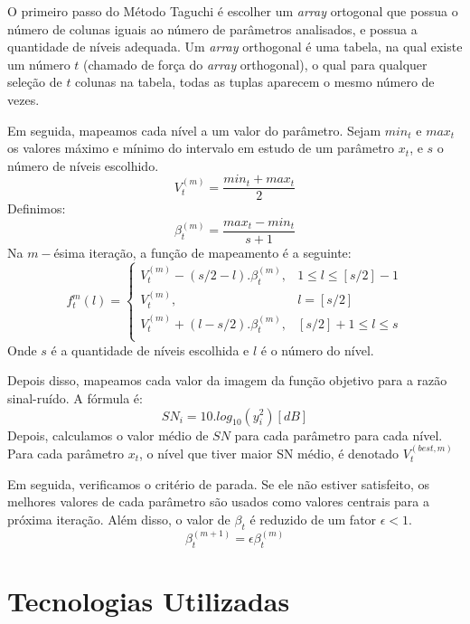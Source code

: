 \documentclass[]{politex}
\begin{document}
O primeiro passo do Método Taguchi é escolher um \textit{array} ortogonal que possua o
número de colunas iguais ao número de parâmetros analisados, e possua a
quantidade de níveis adequada. Um \textit{array} orthogonal é uma tabela, na qual existe um
número $t$ (chamado de força do \textit{array} orthogonal), o qual para qualquer seleção de
$t$ colunas na tabela, todas as tuplas aparecem o mesmo número de vezes.

Em seguida, mapeamos cada nível a um valor do parâmetro. Sejam $min_t$ e $max_t$
os valores máximo e mínimo do intervalo em estudo de um parâmetro $x_t$, e $s$ o
número de níveis escolhido.
\begin{equation*}
    V_t^{(m)}=\frac{min_t+max_t}{2}
\end{equation*}
Definimos:
\begin{equation*}
    \beta_t^{(m)} = \frac{max_t-min_t}{s+1}
\end{equation*}
Na $m-$ésima iteração, a função de mapeamento é a seguinte:
\begin{equation*}
    f_t^m(l) =
    \begin{cases}
        V_t^{(m)} - (s/2 - l).\beta_t^{(m)}, & 1 \leq l \leq [s/2] - 1 \\
        V_t^{(m)}, &  l = [s/2]\\
        V_t^{(m)} + (l - s/2).\beta_t^{(m)}, & [s/2] + 1 \leq l \leq s \\
    \end{cases}
\end{equation*}
Onde $s$ é a quantidade de níveis escolhida e $l$ é o número do nível.

Depois disso, mapeamos cada valor da imagem da função objetivo para a razão
sinal-ruído. A fórmula é:
\begin{equation*}
    SN_i = 10.log_{10}(y_i^2) [dB]
\end{equation*}
Depois, calculamos o valor médio de $SN$ para cada parâmetro para cada nível.
Para cada parâmetro $x_t$, o nível que tiver maior SN médio, é denotado
$V_t^{(best, m)}$

Em seguida, verificamos o critério de parada. Se ele não estiver satisfeito, os
melhores valores de cada parâmetro são usados como valores centrais para a
próxima iteração. Além disso, o valor de $\beta_t$ é reduzido de um fator $\epsilon < 1$.
\begin{equation*}
    \beta_t^{(m+1)} = \epsilon\beta_t^{(m)}
\end{equation*}

\chapter{Tecnologias Utilizadas}
\end{document}
